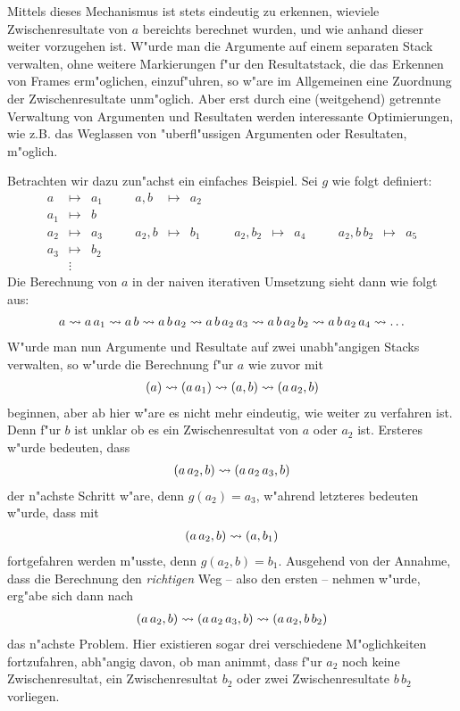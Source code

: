 \documentclass[12pt,a4paper]{article}
\begin{document}
Mittels dieses Mechanismus ist stets eindeutig zu erkennen, wieviele Zwischenresultate von $a$ bereichts
berechnet wurden, und wie anhand dieser weiter vorzugehen ist. W"urde man die Argumente auf einem separaten
Stack verwalten, ohne weitere Markierungen f"ur den Resultatstack, die das Erkennen von Frames erm"oglichen,
einzuf"uhren, so w"are im Allgemeinen eine Zuordnung der Zwischenresultate unm"oglich. Aber erst durch eine
(weitgehend) getrennte Verwaltung von Argumenten und Resultaten werden interessante Optimierungen, wie z.B.
das Weglassen von "uberfl"ussigen Argumenten oder Resultaten, m"oglich.

Betrachten wir dazu zun"achst ein einfaches Beispiel. Sei $g$ wie folgt definiert:
\[\begin{array}{lclclclclcllclc}
  a &\mapsto& a_1 &\quad& a,b &\mapsto& a_2 &\quad& && &\quad& \\
  a_1 &\mapsto& b \\
  a_2 &\mapsto& a_3 && a_2,b &\mapsto& b_1 && a_2,b_2 &\mapsto& a_4 && a_2,b\,b_2 &\mapsto& a_5 \\
  a_3 &\mapsto& b_2 \\
  &\vdots&
\end{array}\]
Die Berechnung von $a$ in der naiven iterativen Umsetzung sieht dann wie folgt aus:
\[\begin{array}{c}
a \rightsquigarrow a\,a_1 \rightsquigarrow a\,b \rightsquigarrow a\,b\,a_2 \rightsquigarrow a\,b\,a_2\,a_3 \rightsquigarrow a\,b\,a_2\,b_2 \rightsquigarrow a\,b\,a_2\,a_4 \rightsquigarrow \ldots
\end{array}\]
W"urde man nun Argumente und Resultate auf zwei unabh"angigen Stacks verwalten, so w"urde die
Berechnung f"ur $a$ wie zuvor mit
\[\begin{array}{c}
(a) \rightsquigarrow (a\,a_1) \rightsquigarrow (a,b) \rightsquigarrow (a\,a_2,b)
\end{array}\]
beginnen, aber ab hier w"are es nicht mehr eindeutig, wie weiter zu verfahren ist. Denn f"ur $b$ ist
unklar ob es ein Zwischenresultat von $a$ oder $a_2$ ist. Ersteres w"urde bedeuten, dass
\[\begin{array}{c}
(a\,a_2,b) \rightsquigarrow (a\,a_2\,a_3,b)
\end{array}\]
der n"achste Schritt w"are, denn $g(a_2)=a_3$, w"ahrend letzteres bedeuten w"urde, dass mit
\[\begin{array}{c}
(a\,a_2,b) \rightsquigarrow (a,b_1)
\end{array}\]
fortgefahren werden m"usste, denn $g(a_2,b)=b_1$. Ausgehend von der Annahme, dass die Berechnung den \emph{richtigen}
Weg -- also den ersten -- nehmen w"urde, erg"abe sich dann nach
\[\begin{array}{c}
(a\,a_2,b) \rightsquigarrow (a\,a_2\,a_3,b) \rightsquigarrow (a\,a_2,b\,b_2)
\end{array}\]
das n"achste Problem. Hier existieren sogar drei verschiedene M"oglichkeiten fortzufahren, abh"angig
davon, ob man animmt, dass f"ur $a_2$ noch keine Zwischenresultat, ein Zwischenresultat $b_2$ oder zwei
Zwischenresultate $b\,b_2$ vorliegen.
\end{document}
